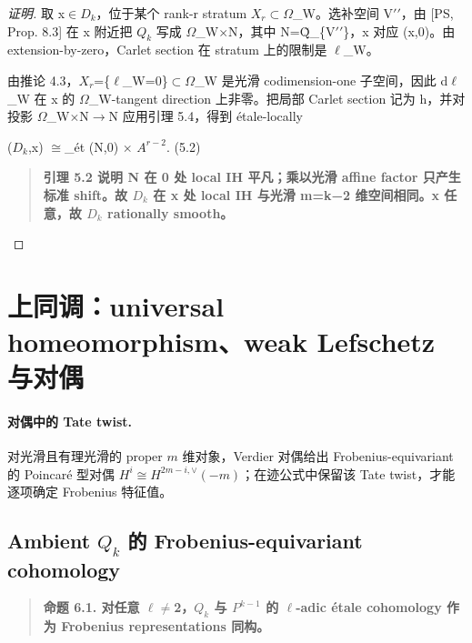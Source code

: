 \documentclass[11pt]{ctexart}
\begin{document}
\begin{proof}[证明] 

取 x\ensuremath{\in}\ensuremath{D_{k}}，位于某个 rank-r stratum \ensuremath{X_{r}}\ensuremath{\subset}\ensuremath{\Omega}\_W。选补空间 V\ensuremath{\prime\prime}，由 [PS, Prop. 8.3] 在 x 附近把 \ensuremath{Q_{k}} 写成 \ensuremath{\Omega}\_W\ensuremath{\times}N，其中 N=Q̃\_\{V\ensuremath{\prime\prime}\}，x 对应 (x,0)。由 extension-by-zero，Carlet section 在 stratum 上的限制是 \ensuremath{\ell}\_W。

由推论 4.3，\ensuremath{X_{r}}=\{\ensuremath{\ell}\_W=0\}\ensuremath{\subset}\ensuremath{\Omega}\_W 是光滑 codimension-one 子空间，因此 d\ensuremath{\ell}\_W 在 x 的 \ensuremath{\Omega}\_W-tangent direction 上非零。把局部 Carlet section 记为 h，并对投影 \ensuremath{\Omega}\_W\ensuremath{\times}N\ensuremath{\to}N 应用引理 5.4，得到 étale-locally

(\ensuremath{D_{k}},x) \ensuremath{\cong}\_ét (N,0) \ensuremath{\times} \ensuremath{A^{r−2}}.    (5.2)

\begin{quote}\textbf{引理 5.2 说明 N 在 0 处 local IH 平凡；乘以光滑 affine factor 只产生标准 shift。故 \ensuremath{D_{k}} 在 x 处 local IH 与光滑 m=k−2 维空间相同。x 任意，故 \ensuremath{D_{k}} rationally smooth。}\end{quote}

\end{proof}

\section{上同调：universal homeomorphism、weak Lefschetz 与对偶}

\paragraph{对偶中的 Tate twist.} 对光滑且有理光滑的 proper $m$ 维对象，Verdier 对偶给出 Frobenius-equivariant 的 Poincar\'e 型对偶 $H^i\cong H^{2m-i,\vee}(-m)$；在迹公式中保留该 Tate twist，才能逐项确定 Frobenius 特征值。

\subsection{Ambient \ensuremath{Q_{k}} 的 Frobenius-equivariant cohomology}

\begin{quote}\textbf{命题 6.1. 对任意 \ensuremath{\ell}\ensuremath{\ne}2，\ensuremath{Q_{k}} 与 \ensuremath{P^{k−1}} 的 \ensuremath{\ell}-adic étale cohomology 作为 Frobenius representations 同构。}\end{quote}
\end{document}
